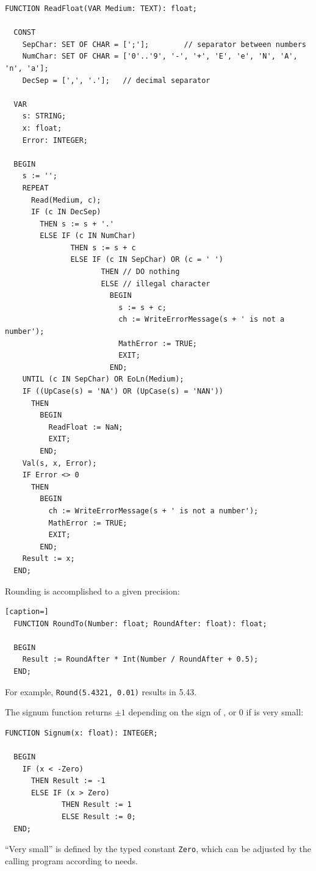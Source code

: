 \begin{refsection}
\begin{lstlisting}[caption=Read floating point number from file]
  FUNCTION ReadFloat(VAR Medium: TEXT): float;

  CONST
    SepChar: SET OF CHAR = [';'];        // separator between numbers
    NumChar: SET OF CHAR = ['0'..'9', '-', '+', 'E', 'e', 'N', 'A', 'n', 'a'];
    DecSep = [',', '.'];   // decimal separator

  VAR
    s: STRING;
    x: float;
    Error: INTEGER;

  BEGIN
    s := '';
    REPEAT
      Read(Medium, c);
      IF (c IN DecSep)
        THEN s := s + '.'
        ELSE IF (c IN NumChar)
               THEN s := s + c
               ELSE IF (c IN SepChar) OR (c = ' ')
                      THEN // DO nothing
                      ELSE // illegal character
                        BEGIN
                          s := s + c;
                          ch := WriteErrorMessage(s + ' is not a number');
                          MathError := TRUE;
                          EXIT;
                        END;
    UNTIL (c IN SepChar) OR EoLn(Medium);
    IF ((UpCase(s) = 'NA') OR (UpCase(s) = 'NAN'))
      THEN
        BEGIN
          ReadFloat := NaN;
          EXIT;
        END;
    Val(s, x, Error);
    IF Error <> 0
      THEN
        BEGIN
          ch := WriteErrorMessage(s + ' is not a number');
          MathError := TRUE;
          EXIT;
        END;
    Result := x;
  END;
\end{lstlisting}

Rounding is accomplished to a given precision:
\begin{lstlisting}[caption=]
  FUNCTION RoundTo(Number: float; RoundAfter: float): float;

  BEGIN
    Result := RoundAfter * Int(Number / RoundAfter + 0.5);
  END;
\end{lstlisting}
For example, \texttt{Round(5.4321, 0.01)} results in \num{5.43}.

The signum function returns \(\pm 1 \) depending on the sign of , or \num{0} if  is very small:
\begin{lstlisting}[caption=Signum function]
  FUNCTION Signum(x: float): INTEGER;

  BEGIN
    IF (x < -Zero)
      THEN Result := -1
      ELSE IF (x > Zero)
             THEN Result := 1
             ELSE Result := 0;
  END;
\end{lstlisting}
``Very small'' is defined by the typed constant \texttt{Zero}, which can be adjusted by the calling program according to needs.


\end{refsection}
